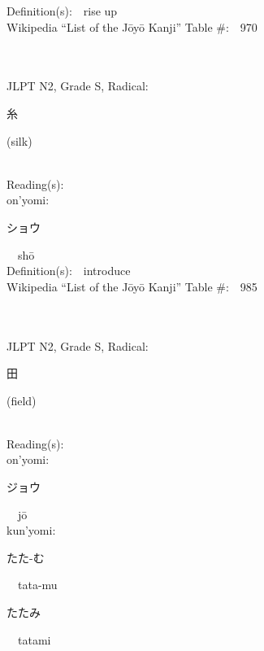 \begin{multicols}{2}
Definition(s):\ \ rise up \\
Wikipedia ``List of the J\=oy\=o Kanji'' Table \#:\ \ 970 \\
\ \ \\
{\fontsize{34pt}{40pt}  }\ \ \\  %
{JLPT N2, Grade S, Radical:\ \ {\begin{CJK}{UTF8}{min} 糸 \end{CJK}} (silk) } \\
Reading(s):\ \ \\
{\hspace*{1em}}on'yomi:\ \ \\
{\hspace*{2em}}{\begin{CJK}{UTF8}{min} ショウ \end{CJK}}\ \ sh\=o\ \ \\
Definition(s):\ \ introduce \\
Wikipedia ``List of the J\=oy\=o Kanji'' Table \#:\ \ 985 \\
\ \ \\
{\fontsize{34pt}{40pt}  }\ \ \\  %
{JLPT N2, Grade S, Radical:\ \ {\begin{CJK}{UTF8}{min} 田 \end{CJK}} (field) } \\
Reading(s):\ \ \\
{\hspace*{1em}}on'yomi:\ \ \\
{\hspace*{2em}}{\begin{CJK}{UTF8}{min} ジョウ \end{CJK}}\ \ j\=o\ \ \\
{\hspace*{1em}}kun'yomi:\ \ \\
{\hspace*{2em}}{\begin{CJK}{UTF8}{min} たた-む \end{CJK}}\ \ tata-mu\ \ \\
{\hspace*{2em}}{\begin{CJK}{UTF8}{min} たたみ \end{CJK}}\ \ tatami\ \ \\

\end{multicols}
